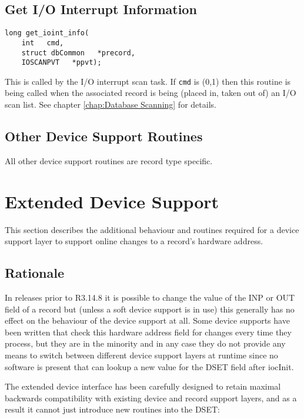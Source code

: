 \subsection{Get I/O Interrupt Information}

\begin{verbatim}
long get_ioint_info(
    int   cmd,
    struct dbCommon   *precord,
    IOSCANPVT   *ppvt);
\end{verbatim}

This is called by the I/O interrupt scan task.
If \verb|cmd| is (0,1) then this routine is being called when the associated record is being (placed in, taken out of) an I/O scan list.
See chapter \ref{chap:Database Scanning} for details.

\subsection{Other Device Support Routines}

All other device support routines are record type specific.

\section{Extended Device Support}
\label{sec:Extended Device Support}

This section describes the additional behaviour and routines required for a device support layer to support online changes to a record's hardware address.

\subsection{Rationale}

In releases prior to R3.14.8 it is possible to change the value of the INP or OUT field of a record but (unless a soft device support is in use) this generally has no effect on the behaviour of the device support at all.
Some device supports have been written that check this hardware address field for changes every time they process, but they are in the minority and in 
any case they do not provide any means to switch between different device support layers at runtime since no software is present that can lookup a new value for the DSET field after iocInit.

The extended device interface has been carefully designed to retain maximal backwards compatibility with existing device and record support layers, and as a result it cannot just introduce new routines into the DSET:

